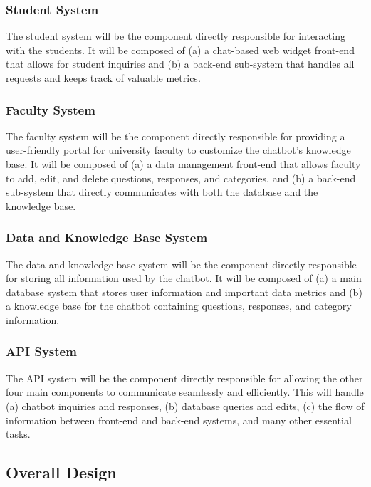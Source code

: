 \documentclass[titlepage, 12pt]{article}
\begin{document}
\subsubsection{Student System}

The student system will be the component directly responsible for interacting with the students. It will be composed of (a) a chat-based web widget front-end that allows for student inquiries and (b) a back-end sub-system that handles all requests and keeps track of valuable metrics.

\subsubsection{Faculty System}

The faculty system will be the component directly responsible for providing a user-friendly portal for university faculty to customize the chatbot’s knowledge base. It will be composed of (a) a data management front-end that allows faculty to add, edit, and delete questions, responses, and categories, and (b) a back-end sub-system that directly communicates with both the database and the knowledge base.

\subsubsection{Data and Knowledge Base System}

The data and knowledge base system will be the component directly responsible for storing all information used by the chatbot. It will be composed of (a) a main database system that stores user information and important data metrics and (b) a knowledge base for the chatbot containing questions, responses, and category information.

\subsubsection{API System}

The API system will be the component directly responsible for allowing the other four main components to communicate seamlessly and efficiently. This will handle (a) chatbot inquiries and responses, (b) database queries and edits, (c) the flow of information between front-end and back-end systems, and many other essential tasks.

\subsection{Overall Design}
\end{document}
